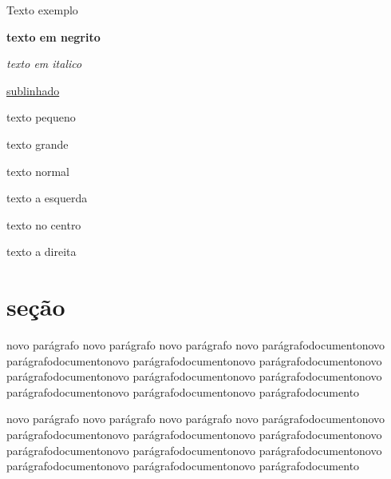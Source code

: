 \documentclass[12pt]{article}
\begin{document}
	
	Texto exemplo
	
	\textbf{texto em negrito}
	
	\textit{texto em italico}
	
	\underline{sublinhado}
	
	{\tiny texto pequeno}
	
	{\Huge texto grande}
	
	texto normal
	
	\begin{flushleft}
		texto a esquerda
	\end{flushleft}

	\begin{center}
		texto no centro
	\end{center}
	
	\begin{flushright}
		texto a direita
	\end{flushright}
	
	\newpage
	\section{seção}
	novo parágrafo novo parágrafo novo parágrafo novo parágrafodocumentonovo parágrafodocumentonovo parágrafodocumentonovo parágrafodocumentonovo parágrafodocumentonovo parágrafodocumentonovo parágrafodocumentonovo parágrafodocumentonovo parágrafodocumentonovo parágrafodocumento \newpage
	
	novo parágrafo novo parágrafo novo parágrafo novo parágrafodocumentonovo parágrafodocumentonovo parágrafodocumentonovo parágrafodocumentonovo parágrafodocumentonovo parágrafodocumentonovo parágrafodocumentonovo parágrafodocumentonovo parágrafodocumentonovo parágrafodocumento
\end{document}
